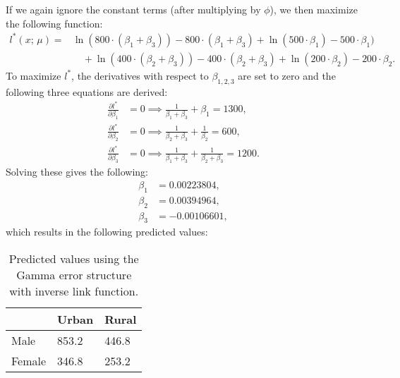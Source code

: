 \documentclass{article}
\begin{document}
If we again ignore the constant terms (after multiplying by $\phi$), we then maximize the following function:
\begin{align}
    l^*(x;\,\mu) = &\ln{(800\cdot(\beta_1+\beta_3))} - 800\cdot(\beta_1+\beta_3) + 
    \ln{(500\cdot\beta_1)} - 500\cdot\beta_1) \nonumber\\
    &\quad+ \ln{(400\cdot(\beta_2+\beta_3))} - 400\cdot(\beta_2+\beta_3) + \ln{(200\cdot\beta_2)} - 200\cdot\beta_2.
\end{align}
To maximize $l^*$, the derivatives with respect to $\beta_{1,2,3}$ are set to zero and the following three equations are derived:
\begin{align}
    \frac{\partial l^*}{\partial\beta_1} &= 0 \implies \frac{1}{\beta_1+\beta_3}+\beta_1 = 1300,\\
    \frac{\partial l^*}{\partial\beta_2} &= 0 \implies \frac{1}{\beta_2+\beta_3}+\frac{1}{\beta_2}=600,\\
    \frac{\partial l^*}{\partial\beta_3} &= 0 \implies \frac{1}{\beta_1+\beta_3}+\frac{1}{\beta_2+\beta_3}=1200.
\end{align}
Solving these gives the following:
\begin{align}
    \beta_1 &= 0.00223804,\\
    \beta_2 &= 0.00394964,\\
    \beta_3 &= -0.00106601,
\end{align}
which results in the following predicted values:
\begin{table}[H]
\centering
\begin{tabular}{l|l|l|}
\cline{2-3}
                             & Urban & Rural \\ \hline
\multicolumn{1}{|l|}{Male}   & 853.2   & 446.8   \\ \hline
\multicolumn{1}{|l|}{Female} & 346.8   & 253.2   \\ \hline
\end{tabular}
    \caption{Predicted values using the Gamma error structure with inverse link function.}
    \label{fig:covariances_example_3}
\end{table}

\nocite{2008APG}
\nocite{géron2019hands}
\nocite{GLM_basics}
\printbibliography
\end{document}

